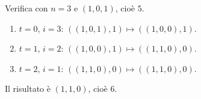 \begin{sol}
\begin{enumerate}
Verifica con $n=3$ e $(1,0,1)$, cioè $5$.
\ 
\begin{enumerate}
\item $t=0$, $i=3$: $((1,0,1),1)\mapsto((1,0,0),1)$.
\item $t=1$, $i=2$: $((1,0,0),1)\mapsto((1,1,0),0)$.
\item $t=2$, $i=1$: $((1,1,0),0)\mapsto((1,1,0),0)$.
\end{enumerate}
Il risultato è $(1,1,0)$, cioè $6$.
\end{enumerate}
\end{sol}
\newpage